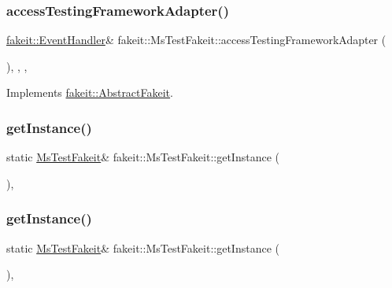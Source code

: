 \subsubsection{\texorpdfstring{accessTestingFrameworkAdapter()}{accessTestingFrameworkAdapter()}\hspace{0.1cm}{\footnotesize\ttfamily [2/2]}}
{\footnotesize\ttfamily \mbox{\hyperlink{structfakeit_1_1EventHandler}{fakeit\+::\+Event\+Handler}}\& fakeit\+::\+Ms\+Test\+Fakeit\+::access\+Testing\+Framework\+Adapter (\begin{DoxyParamCaption}{ }\end{DoxyParamCaption})\hspace{0.3cm}{\ttfamily [inline]}, {\ttfamily [override]}, {\ttfamily [protected]}, {\ttfamily [virtual]}}



Implements \mbox{\hyperlink{classfakeit_1_1AbstractFakeit_a9476180a503524d49d1978fbbc125b01}{fakeit\+::\+Abstract\+Fakeit}}.

\mbox{\label{classfakeit_1_1MsTestFakeit_afcc31da5a006e8c523632142918eda9a}} 
\subsubsection{\texorpdfstring{getInstance()}{getInstance()}\hspace{0.1cm}{\footnotesize\ttfamily [1/2]}}
{\footnotesize\ttfamily static \mbox{\hyperlink{classfakeit_1_1MsTestFakeit}{Ms\+Test\+Fakeit}}\& fakeit\+::\+Ms\+Test\+Fakeit\+::get\+Instance (\begin{DoxyParamCaption}{ }\end{DoxyParamCaption})\hspace{0.3cm}{\ttfamily [inline]}, {\ttfamily [static]}}

\mbox{\label{classfakeit_1_1MsTestFakeit_afcc31da5a006e8c523632142918eda9a}} 
\subsubsection{\texorpdfstring{getInstance()}{getInstance()}\hspace{0.1cm}{\footnotesize\ttfamily [2/2]}}
{\footnotesize\ttfamily static \mbox{\hyperlink{classfakeit_1_1MsTestFakeit}{Ms\+Test\+Fakeit}}\& fakeit\+::\+Ms\+Test\+Fakeit\+::get\+Instance (\begin{DoxyParamCaption}{ }\end{DoxyParamCaption})\hspace{0.3cm}{\ttfamily [inline]}, {\ttfamily [static]}}



